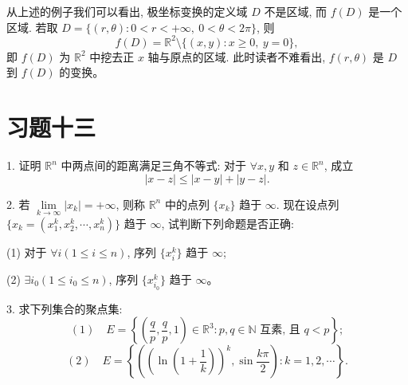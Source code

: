 \documentclass[UTF8,12pt,a4paper,fontset=fandol]{ctexart}
\begin{document}
从上述的例子我们可以看出, 极坐标变换的定义域 $D$ 不是区域, 而 $f(D)$ 是一个区域. 若取 $D=\{(r,\theta):0<r<+\infty,\ 0<\theta<2\pi\}$, 则
\[
  f(D)=\mathbb R^2\setminus\{(x,y):x\geqslant0,\ y=0\},
\]
即 $f(D)$ 为 $\mathbb R^2$ 中挖去正 $x$ 轴与原点的区域. 此时读者不难看出, $f(r,\theta)$ 是 $D$ 到 $f(D)$ 的变换。

\section*{习题十三}

1. 证明 $\mathbb R^n$ 中两点间的距离满足三角不等式: 对于 $\forall x,y$ 和 $z\in\mathbb R^n$, 成立
\[
  |x-z|\leqslant |x-y|+|y-z|.
\]

2. 若 $\lim\limits_{k\to\infty}|x_k|=+\infty$, 则称 $\mathbb R^n$ 中的点列 $\{x_k\}$ 趋于 $\infty$. 现在设点列 $\{x_k=(x_1^k,x_2^k,\cdots,x_n^k)\}$ 趋于 $\infty$, 试判断下列命题是否正确:

(1) 对于 $\forall i(1\leqslant i\leqslant n)$, 序列 $\{x_i^k\}$ 趋于 $\infty$;

(2) $\exists i_0(1\leqslant i_0\leqslant n)$, 序列 $\{x_{i_0}^k\}$ 趋于 $\infty$。

3. 求下列集合的聚点集:
\[
  (1)\quad E=\left\{\left(\frac qp,\frac qp,1\right)\in\mathbb R^3:p,q\in\mathbb N\text{ 互素, 且 }q<p\right\};
\]
\[
  (2)\quad E=\left\{\left(\left(\ln\left(1+\frac1k\right)\right)^k,\sin\frac{k\pi}{2}\right):k=1,2,\cdots\right\}.
\]
\end{document}
